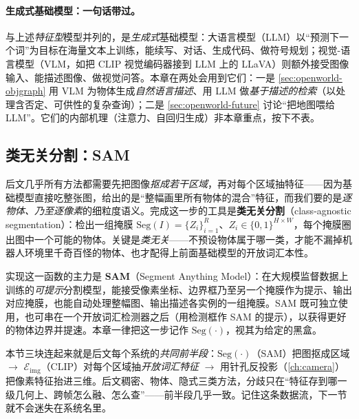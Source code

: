 \paragraph{生成式基础模型：一句话带过。}
与上述\emph{特征型}模型并列的，是\emph{生成式}基础模型：大语言模型（LLM）以“预测下一个词”为目标在海量文本上训练，能续写、对话、生成代码、做符号规划；视觉-语言模型（VLM，如把 CLIP 视觉编码器接到 LLM 上的 LLaVA）则额外接受图像输入、能描述图像、做视觉问答\cite{paull2026openworld}。本章在两处会用到它们：一是 \cref{sec:openworld-objgraph} 用 VLM 为物体生成\emph{自然语言描述}、用 LLM 做\emph{基于描述的检索}（以处理含否定、可供性的复杂查询）；二是 \cref{sec:openworld-future} 讨论“把地图喂给 LLM”。它们的内部机理（注意力、自回归生成）非本章重点，按下不表。

\subsection{类无关分割：SAM}
\label{sec:openworld-sam}

后文几乎所有方法都需要先把图像\emph{抠成若干区域}，再对每个区域抽特征——因为基础模型直接吃整张图，给出的是“整幅画里所有物体的混合”特征，而我们要的是\emph{逐物体、乃至逐像素}的细粒度语义。完成这一步的工具是\textbf{类无关分割}（class-agnostic segmentation）：检出一组掩膜 $\mathrm{Seg}(I)=\{Z_i\}_{i=1}^{R}$、$Z_i\in\{0,1\}^{H\times W}$，每个掩膜圈出图中一个可能的物体。关键是\emph{类无关}——不预设物体属于哪一类，才能不漏掉机器人环境里千奇百怪的物体、也才配得上前面基础模型的开放词汇本性\cite{paull2026openworld}。

实现这一函数的主力是 \textbf{SAM}（Segment Anything Model）\cite{kirillov2023sam}：在大规模监督数据上训练的\emph{可提示}分割模型，能接受像素坐标、边界框乃至另一个掩膜作为提示、输出对应掩膜，也能自动处理整幅图、输出描述各实例的一组掩膜。SAM 既可独立使用，也可串在一个开放词汇检测器之后（用检测框作 SAM 的提示），以获得更好的物体边界并提速。本章一律把这一步记作 $\mathrm{Seg}(\cdot)$，视其为给定的黑盒。

\begin{insight}
本节三块连起来就是后文每个系统的\emph{共同前半段}：$\mathrm{Seg}(\cdot)$（SAM）把图抠成区域 $\to$ $\mathcal{E}_{\mathrm{img}}$（CLIP）对每个区域抽\emph{开放词汇特征} $\to$ 用针孔反投影（\cref{ch:camera}）把像素特征抬进三维。后文稠密、物体、隐式三类方法，分歧只在“特征存到哪一级几何上、跨帧怎么融、怎么查”——前半段几乎一致。记住这条数据流，下一节就不会迷失在系统名里。
\end{insight}

